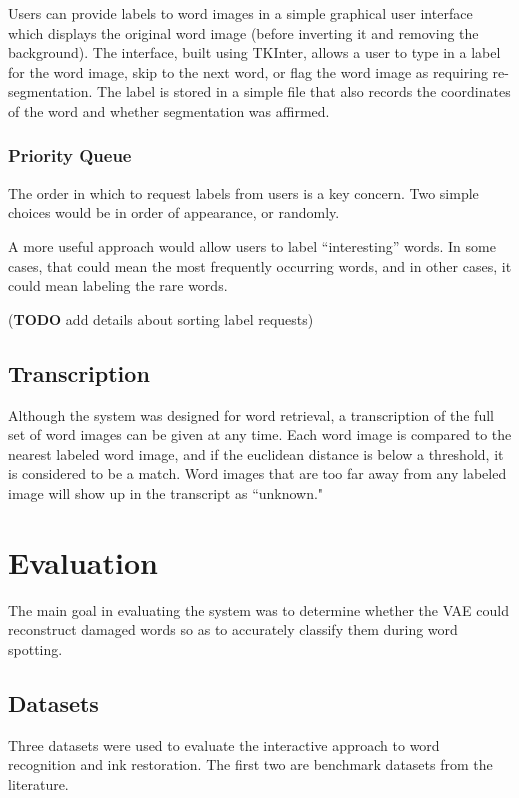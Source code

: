 \documentclass[final]{ukthesis}
\begin{document}
Users can provide labels to word images in a simple graphical user interface which displays the original word image (before inverting it and removing the background). The interface, built using TKInter, allows a user to type in a label for the word image, skip to the next word, or flag the word image as requiring re-segmentation. The label is stored in a simple file that also records the coordinates of the word and whether segmentation was affirmed.

\subsection{Priority Queue}
The order in which to request labels from users is a key concern. Two simple choices would be in order of appearance, or randomly.

A more useful approach would allow users to label ``interesting'' words. In some cases, that could mean the most frequently occurring words, and in other cases, it could mean labeling the rare words.

(\textbf{TODO} add details about sorting label requests)


%
%
\section{Transcription}
Although the system was designed for word retrieval, a transcription of the full set of word images can be given at any time. Each word image is compared to the nearest labeled word image, and if the euclidean distance is below a threshold, it is considered to be a match. Word images that are too far away from any labeled image will show up in the transcript as ``unknown." 




%
%
%
\chapter{Evaluation}
The main goal in evaluating the system was to determine whether the VAE could reconstruct damaged words so as to accurately classify them during word spotting.

%
%
\section{Datasets}
Three datasets were used to evaluate the interactive approach to word recognition and ink restoration. The first two are benchmark datasets from the literature.
\end{document}
